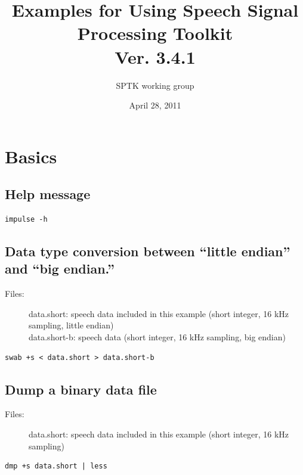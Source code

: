 \documentclass[a4paper,10pt]{article}
\title{
  Examples for Using Speech Signal Processing Toolkit\\
  Ver. 3.4.1}
\author{SPTK working group}
\date{April 28, 2011}
\begin{document}
\maketitle

\tableofcontents

\newpage

\section{Basics}

\subsection{Help message}

\begin{verbatim}
impulse -h
\end{verbatim}

\subsection{Data type conversion between ``little endian'' and ``big endian.''}

\begin{description}
\item[Files:]
  data.short: speech data included in this example (short integer, 16 kHz sampling, little endian)\\
  data.short-b: speech data (short integer, 16 kHz sampling, big endian)
\end{description}
 
\begin{verbatim}
swab +s < data.short > data.short-b
\end{verbatim}

\subsection{Dump a binary data file}

\begin{description}
\item[Files:]
  data.short: speech data included in this example (short integer, 16 kHz sampling)
\end{description}

\begin{verbatim}
dmp +s data.short | less
\end{verbatim}
\end{document}
